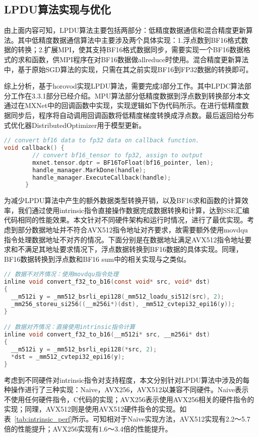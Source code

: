 \subsection{LPDU算法实现与优化}
由上面内容可知，LPDU算法主要包括两部分：低精度数据通信和混合精度更新算法。其中低精度数据通信算法中主要涉及两个具体实现：1.浮点数到BF16格式数据的转换；2.扩展MPI，使其支持BF16格式数据同步，需要实现一个BF16数据格式的求和函数，供MPI程序在对BF16数据做allreduce时使用。混合精度更新算法中，基于原始SGD算法的实现，只需在其之前实现BF16到FP32数据的转换即可。

综上分析，基于horovod实现LPDU算法，需要完成3部分工作。其中LPDC算法部分工作在3.3.1部分已经介绍。MPU算法部分低精度数据到浮点数到转换部分本文通过在MXNet中的回调函数中实现，实现逻辑如下伪代码所示。在进行低精度数据同步后，程序将自动调用回调函数将低精度梯度转换成浮点数。最后返回给分布式优化器DistributedOptimizer用于模型更新。
\begin{lstlisting}[language=C, numbers=none]
// convert bf16 data to fp32 data on callback function.
void callback() {
        // convert bf16_tensor to fp32, assign to output
        mxnet.tensor.dptr = BF16ToFloat(bf16_pointer, len);
        handle_manager.MarkDone(handle);
        handle_manager.ExecuteCallback(handle);
      }
\end{lstlisting}

为减少LPDU算法中产生的额外数据类型转换开销，以及BF16求和函数的计算效率，我们通过使用intrinsic指令直接操作数据完成数据转换和计算，达到SSE汇编代码相同的性能效果。本文针对不同硬件架构和运行时情况，进行了最优实现。考虑到部分数据地址并不符合AVX512指令地址对齐要求，故需要额外使用movdqu指令处理数据地址不对齐的情况。下面分别是在数据地址满足AVX512指令地址要求和不满足其地址要求情况下，浮点数据转换到BF16数据的具体实现。同理，BF16数据转换到浮点数和BF16 sum中的相关实现与之类似。

\begin{lstlisting}[language=C, numbers=none]
// 数据不对齐情况：使用movdqu指令处理
inline void convert_f32_to_b16(const void* src, void* dst)
{
  __m512i y = _mm512_bsrli_epi128(_mm512_loadu_si512(src), 2);
  _mm256_storeu_si256((__m256i*)(dst), _mm512_cvtepi32_epi16(y));
}

// 数据对齐情况：直接使用intrinsic指令计算
inline void convert_f32_to_b16(__m512i* src, __m256i* dst)
{
  __m512i y = _mm512_bsrli_epi128(*src, 2);
  *dst = _mm512_cvtepi32_epi16(y);
}
\end{lstlisting}

考虑到不同硬件对intrinsic指令对支持程度，本文分别针对LPDU算法中涉及的每种操作进行了三种实现：Naive，AVX256，AVX512以兼容不同硬件。Naive表示不使用任何硬件指令，C代码的实现；AVX256表示使用AVX256相关的硬件指令的实现；同理，AVX512则是使用AVX512硬件指令的实现。如表~\ref{tab:intrinsic_perf}所示。可知相对于Naive实现方法，AVX512实现有2.2～5.7倍的性能提升；AVX256实现有1.6～3.4倍的性能提升。

